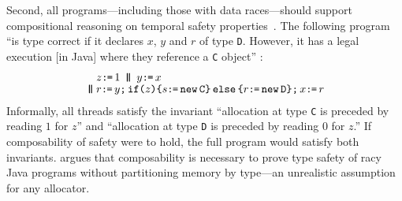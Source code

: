 Second, all programs---including those with data races---should support compositional reasoning on temporal safety properties~\cite{PnueliSafety,Misra:1981:PNP:1313338.1313770,StarkSafety,Abadi:1993:CS:151646.151649}.
The following program ``is type correct if it declares $x$, $y$ and $r$ of type \texttt{D}. However, it has a legal execution [in Java] where they reference a \texttt{C} object'' \citep[Fig.~8]{DBLP:journals/toplas/Lochbihler13}:
\begin{gather}
  \label{lochbihler}
  \begin{aligned}
    &z \GETS 1
    \PAR %
    y\GETS x
    \\[-1ex] \PAR&
    \aReg\GETS y \SEMI \IF{z} \THEN \bReg \GETS \NEW \texttt{C} \ELSE \aReg \GETS \NEW \texttt{D} \FI  \SEMI x \GETS \aReg 
  \end{aligned}
\end{gather}
 Informally, all threads satisfy the invariant ``allocation at type \texttt{C} is preceded by reading $1$ for $z$'' and ``allocation at type \texttt{D} is preceded by reading $0$ for $z$.''  If composability of safety were to hold, the full program would satisfy both invariants.
\citeauthor{DBLP:journals/toplas/Lochbihler13} argues that composability is necessary to prove type safety of racy Java programs without partitioning memory by type---an unrealistic assumption for any allocator. %

